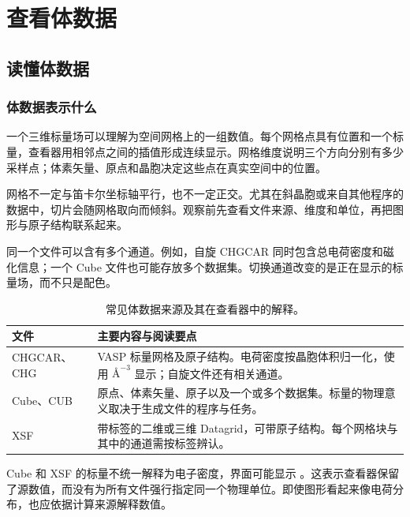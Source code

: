 \chapter{查看体数据}\label{ch:volume}


\section{读懂体数据}

\subsection{体数据表示什么}

一个三维标量场可以理解为空间网格上的一组数值。每个网格点具有位置和一个标量，查看器用相邻点之间的插值形成连续显示。网格维度说明三个方向分别有多少采样点；体素矢量、原点和晶胞决定这些点在真实空间中的位置。

网格不一定与笛卡尔坐标轴平行，也不一定正交。尤其在斜晶胞或来自其他程序的数据中，切片会随网格取向而倾斜。观察前先查看文件来源、维度和单位，再把图形与原子结构联系起来。

同一个文件可以含有多个通道。例如，自旋 CHGCAR 同时包含总电荷密度和磁化信息；一个 Cube 文件也可能存放多个数据集。切换通道改变的是正在显示的标量场，而不只是配色。

\begin{table}[htbp]
\centering
\caption{常见体数据来源及其在查看器中的解释。}
\begin{tabularx}{\linewidth}{lX}
\toprule
文件 & 主要内容与阅读要点 \\
\midrule
CHGCAR、CHG & VASP 标量网格及原子结构。电荷密度按晶胞体积归一化，使用 $\text{\AA}^{-3}$ 显示；自旋文件还有相关通道。\\
Cube、CUB & 原点、体素矢量、原子以及一个或多个数据集。标量的物理意义取决于生成文件的程序与任务。\\
XSF & 带标签的二维或三维 Datagrid，可带原子结构。每个网格块与其中的通道需按标签辨认。\\
\bottomrule
\end{tabularx}
\end{table}

Cube 和 XSF 的标量不统一解释为电子密度，界面可能显示 。这表示查看器保留了源数值，而没有为所有文件强行指定同一个物理单位。即使图形看起来像电荷分布，也应依据计算来源解释数值。

